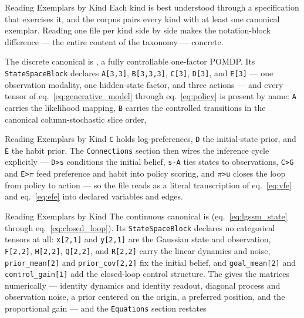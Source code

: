 \documentclass[
  ignorenonframetext,
]{beamer}
\begin{document}
\begin{frame}{Reading Exemplars by Kind}
\protect{}\label{reading-exemplars-by-kind}
Each kind is best understood through a specification that exercises it,
and the corpus pairs every kind with at least one canonical exemplar.
Reading one file per kind side by side makes the notation-block
difference --- the entire content of the taxonomy --- concrete.

The discrete canonical is
, a fully
controllable one-factor POMDP. Its \texttt{StateSpaceBlock} declares
\texttt{A{[}3,3{]}}, \texttt{B{[}3,3,3{]}}, \texttt{C{[}3{]}},
\texttt{D{[}3{]}}, and \texttt{E{[}3{]}} --- one observation modality,
one hidden-state factor, and three actions --- and every tensor of
eq.~\ref{eq:generative_model} through eq.~\ref{eq:policy} is present by
name: \texttt{A} carries the likelihood mapping, \texttt{B} carries the
controlled transitions in the canonical column-stochastic slice order,
\end{frame}

\begin{frame}{Reading Exemplars by Kind}
\texttt{C} holds log-preferences, \texttt{D} the initial-state prior,
and \texttt{E} the habit prior. The \texttt{Connections} section then
wires the inference cycle explicitly --- \texttt{D\textgreater{}s}
conditions the initial belief, \texttt{s-A} ties states to observations,
\texttt{C\textgreater{}G} and \texttt{E\textgreater{}\texorpdfstring{\ensuremath{\pi}}{pi}} feed preference
and habit into policy scoring, and \texttt{\texorpdfstring{\ensuremath{\pi}}{pi}\textgreater{}u} closes the
loop from policy to action --- so the file reads as a literal
transcription of eq.~\ref{eq:vfe} and eq.~\ref{eq:efe} into declared
variables and edges.

\end{frame}

\begin{frame}{Reading Exemplars by Kind}
The continuous canonical is
(eq.~\ref{eq:lgssm_state} through eq.~\ref{eq:closed_loop}). Its
\texttt{StateSpaceBlock} declares no categorical tensors at all:
\texttt{x{[}2,1{]}} and \texttt{y{[}2,1{]}} are the Gaussian state and
observation, \texttt{F{[}2,2{]}}, \texttt{H{[}2,2{]}},
\texttt{Q{[}2,2{]}}, and \texttt{R{[}2,2{]}} carry the linear dynamics
and noise, \texttt{prior\_mean{[}2{]}} and \texttt{prior\_cov{[}2,2{]}}
fix the initial belief, and \texttt{goal\_mean{[}2{]}} and
\texttt{control\_gain{[}1{]}} add the closed-loop control structure. The
 gives the matrices numerically ---
identity dynamics and identity readout, diagonal process and observation
noise, a prior centered on the origin, a preferred position, and the
proportional gain --- and the \texttt{Equations} section restates
\end{frame}
\end{document}

